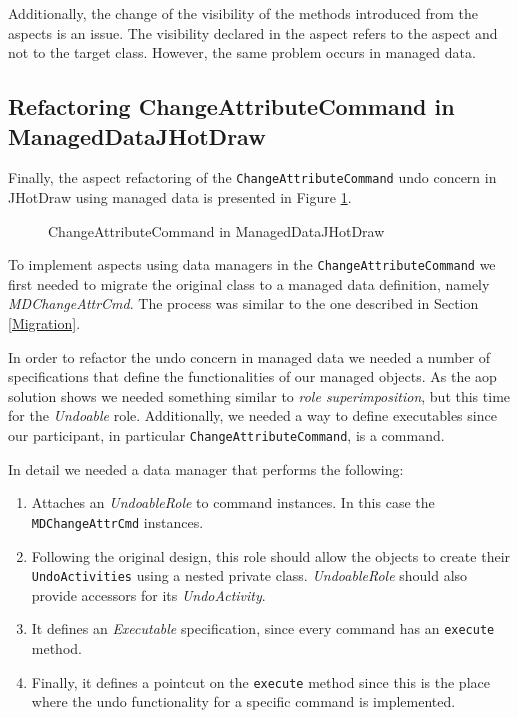 Additionally, the change of the visibility of the methods introduced from the aspects is an issue.
The visibility declared in the aspect refers to the aspect and not to the target class. 
However, the same problem occurs in managed data.

\subsection{Refactoring ChangeAttributeCommand in ManagedDataJHotDraw}
Finally, the aspect refactoring of the \texttt{ChangeAttributeCommand} undo concern in JHotDraw using managed data is presented in Figure \ref{fig:JHotDraw_Undo_Command_ChangeAttributeCommand_MD}.

\begin{figure} [H]
	\centering
  	\caption{ChangeAttributeCommand in ManagedDataJHotDraw}
  	\label{fig:JHotDraw_Undo_Command_ChangeAttributeCommand_MD}
\end{figure}

To implement aspects using data managers in the \texttt{ChangeAttributeCommand} we first needed to migrate the original class to a managed data definition, namely \textit{MDChangeAttrCmd}.
The process was similar to the one described in Section \ref{Migration}.

In order to refactor the undo concern in managed data we needed a number of specifications that define the functionalities of our managed objects.
As the \ac{aop} solution shows we needed something similar to \textit{role superimposition}, but this time for the \textit{Undoable} role.
Additionally, we needed a way to define executables since our participant, in particular \texttt{ChangeAttributeCommand}, is a command.

In detail we needed a data manager that performs the following:
\begin{enumerate}
	
	\item Attaches an \textit{UndoableRole} to command instances.
	In this case the \texttt{MDChangeAttrCmd} instances.

	\item Following the original design, this role should allow the objects to create their \texttt{UndoActivities} using a nested private class.
	\textit{UndoableRole} should also provide accessors for its \textit{UndoActivity}.

	\item It defines an \textit{Executable} specification, since every command has an \texttt{execute} method.

	\item Finally, it defines a pointcut on the \texttt{execute} method since this is the place where the undo functionality for a specific command is implemented.

\end{enumerate}

